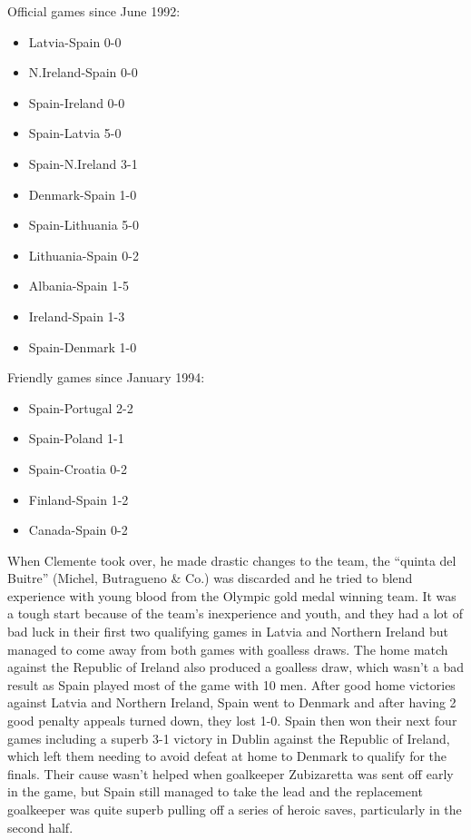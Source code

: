 Official games since June 1992:
\begin{itemize}
\item Latvia-Spain 0-0
\item N.Ireland-Spain 0-0
\item Spain-Ireland 0-0
\item Spain-Latvia 5-0
\item Spain-N.Ireland 3-1
\item Denmark-Spain 1-0
\item Spain-Lithuania 5-0
\item Lithuania-Spain 0-2
\item Albania-Spain 1-5
\item Ireland-Spain 1-3
\item Spain-Denmark 1-0
\end{itemize}
Friendly games since January 1994:
\begin{itemize}
\item Spain-Portugal 2-2
\item Spain-Poland  1-1
\item Spain-Croatia  0-2
\item Finland-Spain  1-2 
\item Canada-Spain   0-2
\end{itemize}

When Clemente took over, he made drastic changes to the team, the ``quinta del
Buitre'' (Michel, Butragueno \& Co.) was discarded and he tried to blend 
experience with young blood from the Olympic gold medal winning team. It was a
tough start because of the team's inexperience and youth, and they had a lot of
bad luck in their first two qualifying games in Latvia and Northern Ireland but
managed to come away from both games with goalless draws. The home match 
against the Republic of Ireland also produced a goalless draw, which wasn't a 
bad result as Spain played most of the game with 10 men. After good home 
victories against Latvia and Northern Ireland, Spain went to Denmark and after
having 2 good penalty appeals turned down, they lost 1-0. Spain then won their 
next four games including a superb 3-1 victory in Dublin against the Republic
of Ireland, which left them needing to avoid defeat at home to Denmark to 
qualify for the finals. Their cause wasn't helped when goalkeeper Zubizaretta
was sent off early in the game, but Spain still managed to take the lead and
the replacement goalkeeper was quite superb pulling off a series of heroic 
saves, particularly in the second half.

